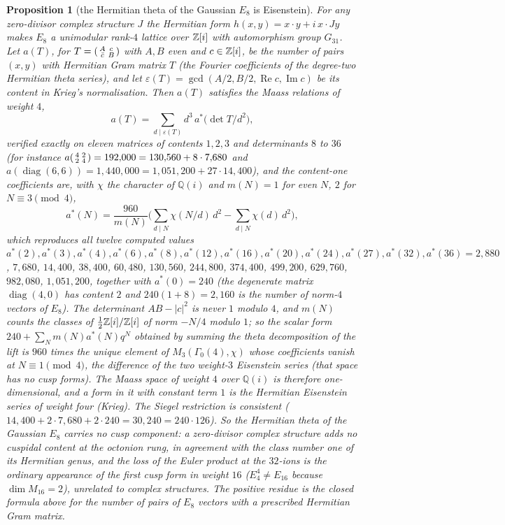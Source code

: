 \documentclass[11pt]{amsart}
\newtheorem{proposition}[theorem]{Proposition}
\theoremstyle{definition}
\begin{document}
\begin{proposition}[the Hermitian theta of the Gaussian $E_8$ is Eisenstein]\label{prop:hermitian}
For any zero-divisor complex structure $J$ the Hermitian form $h(x,y)=x\cdot y+i\,x\cdot Jy$ makes $E_8$ a unimodular rank-$4$ lattice over $\mathbb{Z}[i]$ with automorphism group $G_{31}$. Let $a(T)$, for $T=\begin{psmallmatrix}A&c\\\bar c&B\end{psmallmatrix}$ with $A,B$ even and $c\in\mathbb{Z}[i]$, be the number of pairs $(x,y)$ with Hermitian Gram matrix $T$ (the Fourier coefficients of the degree-two Hermitian theta series), and let $\varepsilon(T)=\gcd(A/2,B/2,\operatorname{Re}c,\operatorname{Im}c)$ be its content in Krieg's normalisation. Then $a(T)$ satisfies the Maass relations of weight $4$,
\[a(T)=\sum_{d\mid\varepsilon(T)}d^{3}\,a^*\!\big(\det T/d^2\big),\]
verified exactly on eleven matrices of contents $1,2,3$ and determinants $8$ to $36$ (for instance $a\begin{psmallmatrix}4&2\\2&4\end{psmallmatrix}=192{,}000=130{,}560+8\cdot7{,}680$ and $a(\operatorname{diag}(6,6))=1{,}440{,}000=1{,}051{,}200+27\cdot14{,}400$), and the content-one coefficients are, with $\chi$ the character of $\mathbb Q(i)$ and $m(N)=1$ for even $N$, $2$ for $N\equiv3\pmod 4$,
\[a^*(N)=\frac{960}{m(N)}\Big(\sum_{d\mid N}\chi(N/d)\,d^2-\sum_{d\mid N}\chi(d)\,d^2\Big),\]
which reproduces all twelve computed values $a^*(2),a^*(3),a^*(4),a^*(6),a^*(8),a^*(12),a^*(16),a^*(20),a^*(24),a^*(27),a^*(32),a^*(36)=2{,}880$, $7{,}680$, $14{,}400$, $38{,}400$, $60{,}480$, $130{,}560$, $244{,}800$, $374{,}400$, $499{,}200$, $629{,}760$, $982{,}080$, $1{,}051{,}200$, together with $a^*(0)=240$ (the degenerate matrix $\operatorname{diag}(4,0)$ has content $2$ and $240(1+8)=2{,}160$ is the number of norm-$4$ vectors of $E_8$). The determinant $AB-|c|^2$ is never $1$ modulo $4$, and $m(N)$ counts the classes of $\tfrac12\mathbb{Z}[i]/\mathbb{Z}[i]$ of norm $-N/4$ modulo $1$; so the scalar form $240+\sum_N m(N)a^*(N)q^N$ obtained by summing the theta decomposition of the lift is $960$ times the unique element of $M_3(\Gamma_0(4),\chi)$ whose coefficients vanish at $N\equiv1\pmod4$, the difference of the two weight-$3$ Eisenstein series (that space has no cusp forms). The Maass space of weight $4$ over $\mathbb Q(i)$ is therefore one-dimensional, and a form in it with constant term $1$ is the Hermitian Eisenstein series of weight four (Krieg). The Siegel restriction is consistent ($14{,}400+2\cdot7{,}680+2\cdot240=30{,}240=240\cdot126$). So the Hermitian theta of the Gaussian $E_8$ carries no cusp component: a zero-divisor complex structure adds no cuspidal content at the octonion rung, in agreement with the class number one of its Hermitian genus, and the loss of the Euler product at the $32$-ions is the ordinary appearance of the first cusp form in weight $16$ ($E_4^4\ne E_{16}$ because $\dim M_{16}=2$), unrelated to complex structures. The positive residue is the closed formula above for the number of pairs of $E_8$ vectors with a prescribed Hermitian Gram matrix.
\end{proposition}
\end{document}
